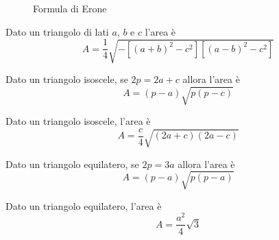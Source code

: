 \begin{figure}
	\centering
	
	\caption{Formula di Erone}
	\label{fig:erone1}
\end{figure}
\begin{cor}\label{cor:Formula_Erone}
	Dato un triangolo di lati $a$, $b$ e $c$ l'area è \[A=\dfrac{1}{4}\sqrt{-[(a+b)^2-c^2][(a-b)^2-c^2]}\]
\end{cor}
\begin{cor}\label{cor:Formula_Erone_isoscele}
	Dato un triangolo isoscele, se $2p=2a+c$ allora l'area è \[A=(p-a)\sqrt{p(p-c)}\]
\end{cor}
\begin{cor}\label{cor:Formula_Erone_isoscele_2}
	Dato un triangolo isoscele, l'area è \[A=\dfrac{c}{4}\sqrt{(2a+c)(2a-c)}\]
\end{cor}
\begin{cor}\label{cor:Formula_Erone_equilatero}
	Dato un triangolo equilatero, se $2p=3a$ allora l'area è \[A=(p-a)\sqrt{p(p-a)}\]
\end{cor}
\begin{cor}\label{cor:Formula_Erone_equilatero_2}
	Dato un triangolo equilatero, l'area è \[A=\dfrac{a^2}{4}\sqrt{3}\]
\end{cor}
